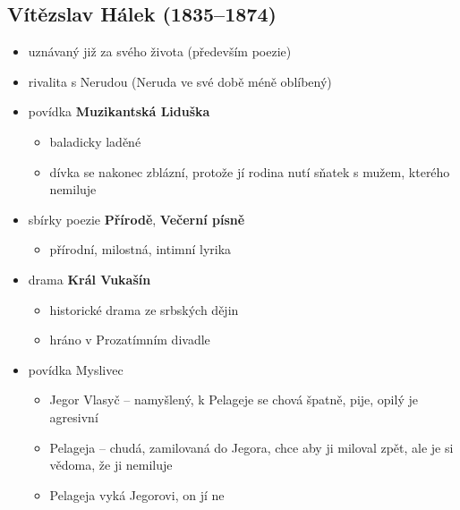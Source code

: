 \subsection{Vítězslav Hálek (1835--1874)}
\begin{itemize}
\item uznávaný již za svého života (především poezie)
\item rivalita s Nerudou (Neruda ve své době méně oblíbený)
\item povídka \textbf{Muzikantská Liduška}
	\begin{itemize}
	\item baladicky laděné
	\item dívka se nakonec zblázní, protože jí rodina nutí sňatek s mužem, kterého nemiluje
	\end{itemize}
\item sbírky poezie \textbf{Přírodě}, \textbf{Večerní písně}
	\begin{itemize}
	\item přírodní, milostná, intimní lyrika
	\end{itemize}
\item drama \textbf{Král Vukašín}
	\begin{itemize}
	\item historické drama ze srbských dějin
	\item hráno v Prozatímním divadle 
	\end{itemize}
\item povídka Myslivec
	\begin{itemize}
	\item Jegor Vlasyč -- namyšlený, k Pelageje se chová špatně, pije, opilý je agresivní
	\item Pelageja -- chudá, zamilovaná do Jegora, chce aby ji miloval zpět, ale je si vědoma, že ji nemiluje
	\item Pelageja vyká Jegorovi, on jí ne
	\end{itemize}
\end{itemize}

